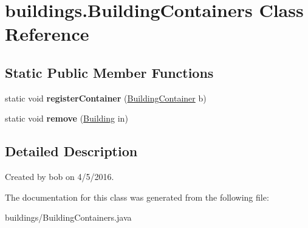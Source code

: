 \hypertarget{classbuildings_1_1_building_containers}{}\section{buildings.\+Building\+Containers Class Reference}
\label{classbuildings_1_1_building_containers}
\subsection*{Static Public Member Functions}
\begin{DoxyCompactItemize}
\item 
static void {\bfseries register\+Container} (\hyperlink{interfacebuildings_1_1_building_container}{Building\+Container} b)\hypertarget{classbuildings_1_1_building_containers_a6775e246927148263db244ab557737ac}{}\label{classbuildings_1_1_building_containers_a6775e246927148263db244ab557737ac}

\item 
static void {\bfseries remove} (\hyperlink{classbuildings_1_1_building}{Building} in)\hypertarget{classbuildings_1_1_building_containers_a7eb41d783eb8527e825440a0b2c5fe2b}{}\label{classbuildings_1_1_building_containers_a7eb41d783eb8527e825440a0b2c5fe2b}

\end{DoxyCompactItemize}


\subsection{Detailed Description}
Created by bob on 4/5/2016. 

The documentation for this class was generated from the following file\+:\begin{DoxyCompactItemize}
\item 
buildings/Building\+Containers.\+java\end{DoxyCompactItemize}
